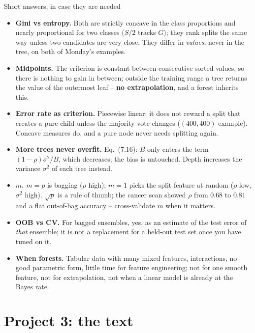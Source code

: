 \documentclass[10pt,aspectratio=169]{beamer}
\newcounter{case}
\begin{document}
\begin{frame}{Short answers, in case they are needed}
\scriptsize
\begin{itemize}
  \item \textbf{Gini vs entropy.}  Both are strictly concave in the class
        proportions and nearly proportional for two classes ($S/2$ tracks
        $G$); they rank splits the same way unless two candidates are very
        close.  They differ in \emph{values}, never in the tree, on both of
        Monday's examples.
  \item \textbf{Midpoints.}  The criterion is constant between consecutive
        sorted values, so there is nothing to gain in between; outside the
        training range a tree returns the value of the outermost leaf --
        \textbf{no extrapolation}, and a forest inherits this.
  \item \textbf{Error rate as criterion.}  Piecewise linear: it does not
        reward a split that creates a pure child unless the majority vote
        changes ($(400,400)$ example).  Concave measures do, and a pure node
        never needs splitting again.
  \item \textbf{More trees never overfit.}  Eq.~(7.16): $B$ only enters the
        term $(1-\rho)\sigma^2/B$, which decreases; the bias is untouched.
        Depth increases the variance $\sigma^2$ of each tree instead.
  \item \textbf{$m$.}  $m=p$ is bagging ($\rho$ high); $m=1$ picks the split
        feature at random ($\rho$ low, $\sigma^2$ high).  $\sqrt p$ is a rule
        of thumb; the cancer scan showed $\rho$ from $0.68$ to $0.81$ and a
        flat out-of-bag accuracy -- cross-validate $m$ when it matters.
  \item \textbf{OOB vs CV.}  For bagged ensembles, yes, as an estimate of
        the test error of \emph{that} ensemble; it is not a replacement for
        a held-out test set once you have tuned on it.
  \item \textbf{When forests.}  Tabular data with many mixed features,
        interactions, no good parametric form, little time for feature
        engineering; not for one smooth feature, not for extrapolation, not
        when a linear model is already at the Bayes rate.
\end{itemize}
\end{frame}

\section{Project 3: the text}
\end{document}
